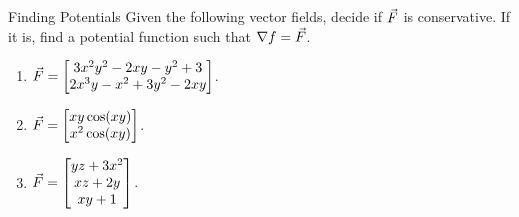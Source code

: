 \begin{exercise}{Finding Potentials}
Given the following vector fields, decide if $\vec{F}$ is conservative. If it is, find a potential function such that $\nabla f=\vec{F}$.
\vspace{1em}
\begin{enumerate}
\item $\vec{F}=\begin{bmatrix}3x^2y^2-2xy-y^2+3\\2x^3y-x^2+3y^2-2xy\end{bmatrix}$.
\vspace{1em}
\item $\vec{F}=\begin{bmatrix}xy\cos(xy)\\x^2\cos(xy)\end{bmatrix}$.
\vspace{1em}
\item $\vec{F}=\begin{bmatrix}yz+3x^2\\xz+2y\\xy+1\end{bmatrix}$.
\end{enumerate}
\end{exercise}


